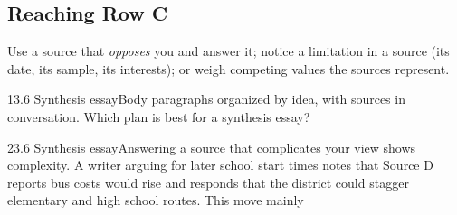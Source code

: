 \documentclass[11pt]{article}
\begin{document}
\subsection{Reaching Row C}
Use a source that \emph{opposes} you and answer it; notice a limitation in a source (its date, its sample, its interests); or weigh competing values the sources represent.

\begin{q}{1}{3.6 Synthesis essay}{Body paragraphs organized by idea, with sources in conversation.}
Which plan is best for a synthesis essay?
\end{q}

\begin{q}{2}{3.6 Synthesis essay}{Answering a source that complicates your view shows complexity.}
A writer arguing for later school start times notes that Source D reports bus costs would rise and responds that the district could stagger elementary and high school routes. This move mainly
\end{q}

\makekey
\end{document}
